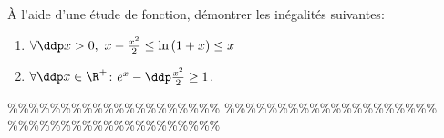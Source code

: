 



\begin{exercice} 
\`{A} l'aide d'une \'etude de fonction, d\'emontrer les in\'egalit\'es suivantes:
\begin{enumerate}
\item $\forall \ddp x>0,\ x-\frac{x^2}{2}\leq \ln{(1+x)}\leq x$
\item $\forall \ddp x\in\R^+$: $e^x-\ddp\frac{x^2}{2}\geq 1$.
\end{enumerate}
\end{exercice}


\%\%\%\%\%\%\%\%\%\%\%\%\%\%\%\%\%\%\%\%
\%\%\%\%\%\%\%\%\%\%\%\%\%\%\%\%\%\%\%\%
\%\%\%\%\%\%\%\%\%\%\%\%\%\%\%\%\%\%\%\%



